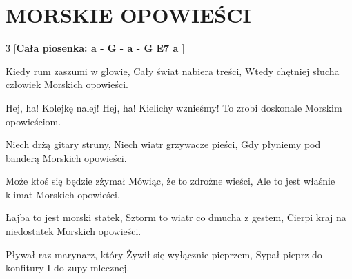 \documentclass[../../../songbook.tex]{subfiles}
\begin{document}
\TabPositions{8cm} %
\section*{MORSKIE OPOWIEŚCI}
{}
\vspace{0.5cm}
\setlength{\columnsep}{0.1cm}
\begin{multicols}{3}
[\textbf{Cała piosenka: {\color{red}  a - G - a - G E7 a  }} 
]
{\tiny
Kiedy rum zaszumi w głowie,  \newline
Cały świat nabiera treści,  \newline
Wtedy chętniej słucha człowiek  \newline
Morskich opowieści.  \newline

Hej, ha! Kolejkę nalej! \newline
Hej, ha! Kielichy wznieśmy! \newline
To zrobi doskonale \newline
Morskim opowieściom. \newline

Niech drżą gitary struny, \newline
Niech wiatr grzywacze pieści, \newline
Gdy płyniemy pod banderą \newline
Morskich opowieści. \newline

Może ktoś się będzie zżymał \newline
Mówiąc, że to zdrożne wieści, \newline
Ale to jest właśnie klimat \newline
Morskich opowieści. \newline

Łajba to jest morski statek, \newline
Sztorm to wiatr co dmucha z gestem, \newline
Cierpi kraj na niedostatek \newline
Morskich opowieści. \newline

Pływał raz marynarz, który \newline
Żywił się wyłącznie pieprzem, \newline
Sypał pieprz do konfitury \newline
I do zupy mlecznej. \newline

}
\end{multicols}
\end{document}
